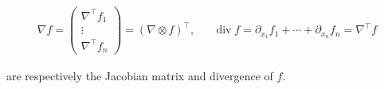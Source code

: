 \documentclass[a4paper,10pt,twoside,leqno]{report}
\newcommand{\1}{\mathbbm{1}}
\begin{document}
\begin{equation}
  \label{eq:jacobian}
  \begin{aligned}
    \nabla f=\begin{pmatrix}
        \nabla^\intercal f_1 \\ \vdots \\ \nabla^\intercal f_n
    \end{pmatrix}=(\nabla \otimes f)^\intercal, && 
    \operatorname{div} f=\partial_{x_1}f_1+\dotsm+\partial_{x_n}f_n=\nabla^\intercal f
    \end{aligned}
\end{equation}


are respectively the Jacobian matrix and divergence of $f$.
\printbibliography
\end{document}
